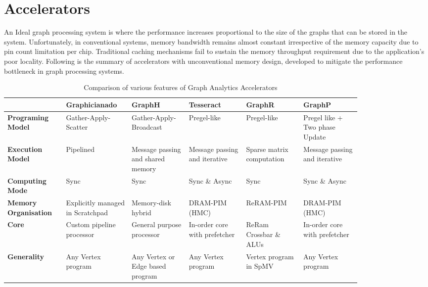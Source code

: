 \section{Accelerators}
An Ideal graph processing system is where the performance increases proportional to the size of the graphs that can be stored in the system. Unfortunately, in conventional systems, memory bandwidth remains almost constant irrespective of the memory capacity due to pin count limitation per chip. Traditional caching mechanisms fail to sustain the memory throughput requirement due to the application's poor locality. Following is the summary of accelerators with unconventional memory design, developed to mitigate the performance bottleneck in graph processing systems. \par

\begin{table*}[t]
\small
\centering
\caption{Comparison of various features of Graph Analytics Accelerators}
\begin{tabular}{|p{0.13\linewidth}|p{0.14\linewidth}|p{0.14\linewidth}|p{0.14\linewidth}|p{0.14\linewidth}|p{0.14\linewidth}|}
\hline
& \textbf{Graphicianado}                 & \textbf{GraphH}      & \textbf{Tesseract}  & \textbf{GraphR}& \textbf{GraphP} \\ \hline

\textbf{Programing Model} & Gather-Apply-Scatter                   & Gather-Apply-Broadcast            & Pregel-like                & Pregel-like            & Pregel like + Two phase Update              \\ \hline

\textbf{Execution Model}  & Pipelined               & Message passing and shared memory & Message passing and iterative & Sparse matrix computation & Message passing and iterative \\ \hline

\textbf{Computing Mode}   & Sync             &    Sync                               & Sync \& Async                         &  Sync                         & Sync \& Async        \\ \hline

\textbf{Memory Organisation}      & Explicitly managed in Scratchpad & Memory-disk hybrid              & DRAM-PIM (HMC)                     & ReRAM-PIM                 & DRAM-PIM (HMC)                     \\ \hline

\textbf{Core} 		& Custom pipeline processor & General purpose processor&In-order core with prefetcher  & ReRam Crossbar \& ALUs  &In-order core with prefetcher \\ \hline

\textbf{Generality}       & Any Vertex program                   &    Any Vertex or Edge based program             & Any Vertex program                & Vertex program in SpMV    & Any Vertex program    \\ \hline


\end{tabular}
\end{table*}

